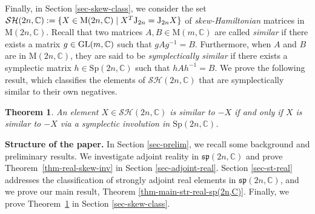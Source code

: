 \documentclass[11pt,reqno]{amsart}
\numberwithin{equation}{section}
\newtheorem{theorem}{Theorem}[section]
\theoremstyle{definition}
\def\C{\mathbb C}
\def\M{{\mathrm M}}
\def\C{\mathbb {C}}
\newcommand{\thmref}[1]{Theorem~\ref{#1}}
\begin{document}
Finally, in Section \ref{sec-skew-class}, we consider the set $\mathcal{SH}(2n, \C):= \{ X \in  \mathrm{M}(2n, \C) \mid X^T {\rm J}_{2n}  = {\rm J}_{2n}X  \}$ of \textit{skew-Hamiltonian} matrices in  ${\M}(2n, \C) $. Recall that  two matrices $A, B \in \mathrm{M}(m,\mathbb{C})$  are called {\it similar} if there exists a matrix $g\in {\rm GL}(m, \C)$ such that $gAg^{-1} =B$. 
Furthermore, when $A$ and $B$ are in $\mathrm{M}(2n,\mathbb{C})$, they are said to be  {\it symplectically similar} if there exists a symplectic matrix  $h \in \mathrm{Sp}(2n,\mathbb{C})$ such that $hAh^{-1} =B$. 
We prove the following result, which classifies the elements of $ \mathcal{SH}(2n, \C)$ that are symplectically similar to their own negatives.
\begin{theorem}\label{thm-class-skew-symp}
	An element $X \in \mathcal{SH}(2n,\C)$  is similar to $-X$ if and only if  $X$ is similar to $-X$  via a symplectic involution in $\mathrm{Sp}(2n,\mathbb{C})$.
\end{theorem} 

\textbf{Structure of the paper.}
In Section \ref{sec-prelim}, we recall some background and preliminary results. We investigate adjoint reality in $\mathfrak{sp}(2n,\mathbb{C})$ and prove  \thmref{thm-real-skew-inv}  in Section \ref{sec-adjoint-real}. Section \ref{sec-st-real} addresses the classification of strongly adjoint real elements in $\mathfrak{sp}(2n,\mathbb{C})$, and we prove our main result, Theorem \ref{thm-main-str-real-sp(2n,C)}. Finally,  we prove \thmref{thm-class-skew-symp}  in  Section \ref{sec-skew-class}.
\end{document}
